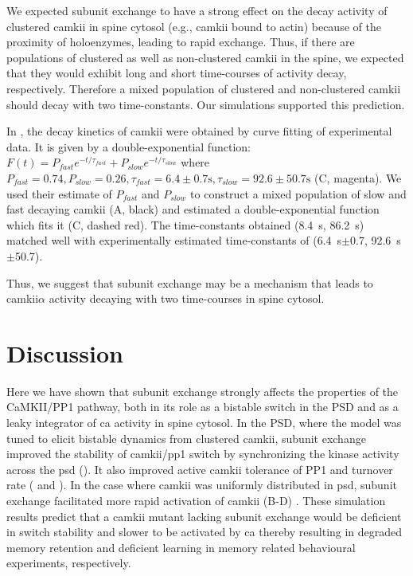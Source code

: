 \documentclass[9pt,lineno,doublespacing]{elife}
\begin{document}
We expected subunit exchange to have a strong effect on the decay activity of
clustered \gls{camkii} in spine cytosol (e.g., \gls{camkii} bound to actin)
because of the proximity of holoenzymes, leading to rapid exchange. Thus, if
there are populations of clustered as well as non-clustered \gls{camkii} in the
spine, we expected that they would exhibit long and short time-courses of
activity decay, respectively. Therefore a mixed population of clustered and
non-clustered \gls{camkii} should decay with two time-constants. Our
simulations supported this prediction. 

In \cite{chang_camkii_2017}, the decay kinetics of \gls{camkii} were obtained by
curve fitting of experimental data. It is given by a double-exponential
function: $F(t)=P_{fast}e^{-t/\tau_{fast}}+P_{slow}e^{-t/\tau_{slow}}$ where
$P_{fast}=0.74, P_{slow}=0.26, \tau_{fast}= 6.4\pm0.7 \si{\second},
\tau_{slow}=92.6 \pm 50.7\si{\second}$ (C, magenta). We
used their estimate of $P_{fast}$ and $P_{slow}$ to construct a mixed population
of slow and fast decaying \gls{camkii} (A, black) and
estimated a double-exponential function which fits it
(C, dashed red). The time-constants obtained
(\SI{8.4}{\second}, \SI{86.2}{\second}) matched well with experimentally
estimated time-constants of (\SI{6.4}{\second}$\pm$0.7,
\SI{92.6}{\second}$\pm$50.7). 

Thus, we suggest that subunit exchange may be a mechanism that leads to
\gls{camkii}$\alpha$ activity decaying with two time-courses in spine 
cytosol.

\section{Discussion}\label{discussion}

Here we have shown that subunit exchange strongly affects the properties of the
CaMKII/PP1 pathway, both in its role as a bistable switch in the PSD and as a
leaky integrator of \gls{ca} activity in spine cytosol. In the PSD, where the
model was tuned to elicit bistable dynamics from clustered \gls{camkii}, subunit
exchange improved the stability of \gls{camkii}/\gls{pp1} switch by
synchronizing the kinase activity across the \gls{psd}
(). It also improved active \gls{camkii} tolerance of
PP1 and turnover rate ( and ). In the case
where \gls{camkii} was uniformly distributed in \gls{psd}, subunit exchange
facilitated more rapid activation of \gls{camkii}
(B-D)
\citep{stratton_activation-triggered_2014}. These simulation results predict
that a \gls{camkii} mutant lacking subunit exchange would be deficient in switch
stability and slower to be activated by \gls{ca} thereby resulting in degraded
memory retention and deficient learning in memory related behavioural
experiments, respectively.
\end{document}
